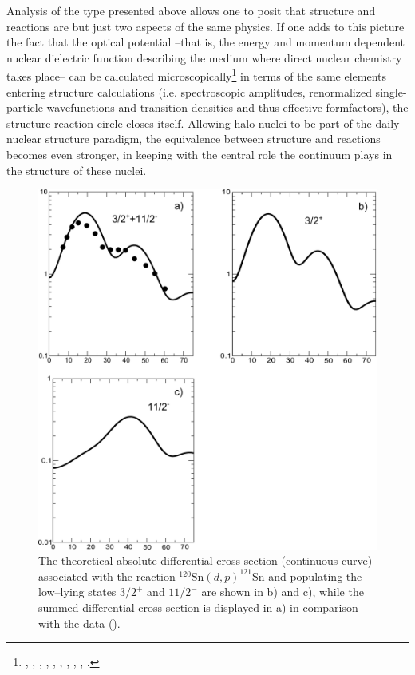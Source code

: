   
  Analysis of the type presented above allows one to posit that structure and reactions are but just two aspects of the same physics. If one adds to this picture the fact that the optical potential --that is, the energy and momentum dependent nuclear dielectric function describing the medium 	where direct nuclear chemistry takes place-- can be calculated microscopically\footnote{\cite{Mahaux:85}, \cite{Fernandez:10}, \cite{Fernandez:10b}, \cite{Broglia:81b}, \cite{Pollarolo:83}, \cite{Broglia:04a}, \cite{Dickhoff:05}, \cite{Jenning:11}, \cite{Montanari:14}, \cite{Rotureau:17}.} in terms of the same elements entering structure calculations (i.e. spectroscopic amplitudes, renormalized single-particle wavefunctions and transition densities and thus effective formfactors), the structure-reaction circle closes itself.
  Allowing  halo nuclei to be part of the daily nuclear structure paradigm, the equivalence between structure and reactions becomes even stronger, in keeping with the central role the continuum plays in the structure of these nuclei.
    \begin{figure}
    \centerline{\includegraphics*[width=\textwidth,angle=0]{C6/figs_C6/fig6_2_2.pdf}}
    \caption{The theoretical absolute differential cross section (continuous curve) associated with the reaction $^{120}$Sn$(d,p)^{121}$Sn and populating the low--lying states $3/2^+$ and $11/2^-$ are shown in b) and c), while the summed differential cross section is displayed in a) in comparison with the data (\cite{Bechara:75}).}\label{fig6.2.2}
    \end{figure}
  
